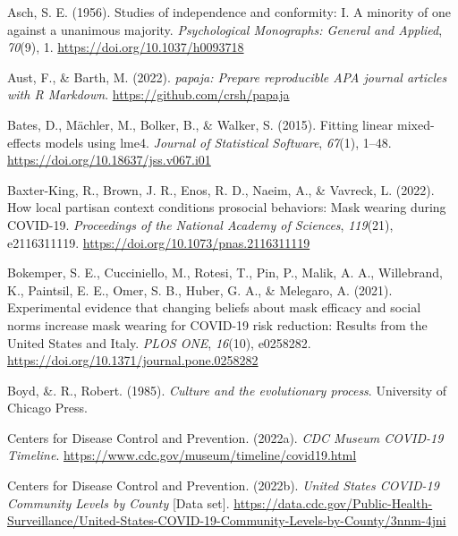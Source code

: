 \documentclass[
  english,
  man,floatsintext]{apa6}
\newlength{\cslhangindent}
\newlength{\cslentryspacingunit} %
\newenvironment{CSLReferences}[2] %
 {%
  \setlength{\parindent}{0pt}
  \ifodd #1
  \let\oldpar\par
  \def\par{\hangindent=\cslhangindent\oldpar}
  \fi
  \setlength{\parskip}{#2\cslentryspacingunit}
 }%
 {}
\begin{document}
\hypertarget{refs}{}
\begin{CSLReferences}{1}{0}
\leavevmode{}%
Asch, S. E. (1956). Studies of independence and conformity: I. A minority of one against a unanimous majority. \emph{Psychological Monographs: General and Applied}, \emph{70}(9), 1. \url{https://doi.org/10.1037/h0093718}

\leavevmode{}%
Aust, F., \& Barth, M. (2022). \emph{{papaja}: {Prepare} reproducible {APA} journal articles with {R Markdown}}. \url{https://github.com/crsh/papaja}

\leavevmode{}%
Bates, D., Mächler, M., Bolker, B., \& Walker, S. (2015). Fitting linear mixed-effects models using lme4. \emph{Journal of Statistical Software}, \emph{67}(1), 1--48. \url{https://doi.org/10.18637/jss.v067.i01}

\leavevmode{}%
Baxter-King, R., Brown, J. R., Enos, R. D., Naeim, A., \& Vavreck, L. (2022). How local partisan context conditions prosocial behaviors: Mask wearing during {COVID-19}. \emph{Proceedings of the National Academy of Sciences}, \emph{119}(21), e2116311119. \url{https://doi.org/10.1073/pnas.2116311119}

\leavevmode{}%
Bokemper, S. E., Cucciniello, M., Rotesi, T., Pin, P., Malik, A. A., Willebrand, K., Paintsil, E. E., Omer, S. B., Huber, G. A., \& Melegaro, A. (2021). Experimental evidence that changing beliefs about mask efficacy and social norms increase mask wearing for {COVID-19} risk reduction: Results from the {United States} and {Italy}. \emph{PLOS ONE}, \emph{16}(10), e0258282. \url{https://doi.org/10.1371/journal.pone.0258282}

\leavevmode{}%
Boyd, \&. R., Robert. (1985). \emph{Culture and the evolutionary process}. University of Chicago Press.

\leavevmode{}%
Centers for Disease Control and Prevention. (2022a). \emph{{CDC Museum COVID-19 Timeline}}. \url{https://www.cdc.gov/museum/timeline/covid19.html}

\leavevmode{}%
Centers for Disease Control and Prevention. (2022b). \emph{{United States COVID-19 Community Levels by County}} {[}Data set{]}. \url{https://data.cdc.gov/Public-Health-Surveillance/United-States-COVID-19-Community-Levels-by-County/3nnm-4jni}


\end{CSLReferences}
\end{document}
